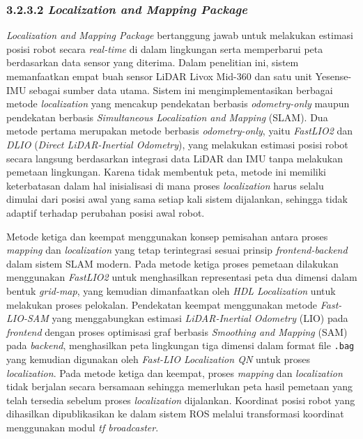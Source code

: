 \subsubsection{3.2.3.2 \emph{Localization and Mapping Package}}
\emph{Localization and Mapping Package} bertanggung jawab untuk melakukan estimasi posisi robot secara \emph{real-time} di dalam lingkungan serta memperbarui peta berdasarkan data sensor yang diterima. Dalam penelitian ini, sistem memanfaatkan empat buah sensor LiDAR Livox Mid-360 dan satu unit Yesense-IMU sebagai sumber data utama. Sistem ini mengimplementasikan berbagai metode \emph{localization} yang mencakup pendekatan berbasis \emph{odometry-only} maupun pendekatan berbasis \emph{Simultaneous Localization and Mapping} (SLAM). Dua metode pertama merupakan metode berbasis \emph{odometry-only}, yaitu \emph{FastLIO2} dan \emph{DLIO} (\emph{Direct LiDAR-Inertial Odometry}), yang melakukan estimasi posisi robot secara langsung berdasarkan integrasi data LiDAR dan IMU tanpa melakukan pemetaan lingkungan. Karena tidak membentuk peta, metode ini memiliki keterbatasan dalam hal inisialisasi di mana proses \emph{localization} harus selalu dimulai dari posisi awal yang sama setiap kali sistem dijalankan, sehingga tidak adaptif terhadap perubahan posisi awal robot. 

Metode ketiga dan keempat menggunakan konsep pemisahan antara proses \emph{mapping} dan \emph{localization} yang tetap terintegrasi sesuai prinsip \emph{frontend-backend} dalam sistem SLAM modern. Pada metode ketiga proses pemetaan dilakukan menggunakan \emph{FastLIO2} untuk menghasilkan representasi peta dua dimensi dalam bentuk \emph{grid-map}, yang kemudian dimanfaatkan oleh \emph{HDL Localization} untuk melakukan proses pelokalan. Pendekatan keempat menggunakan metode \emph{Fast-LIO-SAM} yang menggabungkan estimasi \emph{LiDAR-Inertial Odometry} (LIO) pada \emph{frontend} dengan proses optimisasi graf berbasis \emph{Smoothing and Mapping} (SAM) pada \emph{backend}, menghasilkan peta lingkungan tiga dimensi dalam format file \texttt{.bag} yang kemudian digunakan oleh \emph{Fast-LIO Localization QN} untuk proses \emph{localization}. Pada metode ketiga dan keempat, proses \emph{mapping} dan \emph{localization} tidak berjalan secara bersamaan sehingga memerlukan peta hasil pemetaan yang telah tersedia sebelum proses \emph{localization} dijalankan. Koordinat posisi robot yang dihasilkan dipublikasikan ke dalam sistem ROS melalui transformasi koordinat menggunakan modul \emph{tf broadcaster}.

